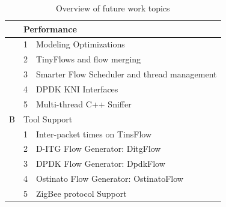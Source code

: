 \begin{table}[!ht]
\centering
\caption{Overview of future work topics}
\label{tab:future-works}
\begin{tabular}{lll}
\hline
\rowcolor[HTML]{9B9B9B} 
\multicolumn{1}{c}{\cellcolor[HTML]{9B9B9B}A} & \multicolumn{2}{l}{\cellcolor[HTML]{9B9B9B}Performance}                                                         \\ \hline
                                              & 1                          & Modeling Optimizations                                                             \\
                                              & \cellcolor[HTML]{EFEFEF}2  & \cellcolor[HTML]{EFEFEF}TinyFlows and flow merging                                 \\
                                              & 3                          & Smarter Flow Scheduler and thread management                                       \\
                                              & \cellcolor[HTML]{EFEFEF}4  & \cellcolor[HTML]{EFEFEF}DPDK KNI Interfaces                                        \\
                                              & 5                          & Multi-thread C++ Sniffer                                                           \\ \hline
\rowcolor[HTML]{9B9B9B} 
B                                             & \multicolumn{2}{l}{\cellcolor[HTML]{9B9B9B}Tool Support}                                                        \\ \hline
                                              & 1                          & Inter-packet times on TinsFlow                                                     \\
                                              & \cellcolor[HTML]{EFEFEF}2  & \cellcolor[HTML]{EFEFEF}D-ITG Flow Generator: DitgFlow                             \\
                                              & 3                          & DPDK Flow Generator: DpdkFlow                                                      \\
                                              & \cellcolor[HTML]{EFEFEF}4  & \cellcolor[HTML]{EFEFEF}Ostinato Flow Generator: OstinatoFlow                      \\
                                              & 5                          & ZigBee protocol Support                                                            \\ \hline

\end{tabular}
\end{table}
